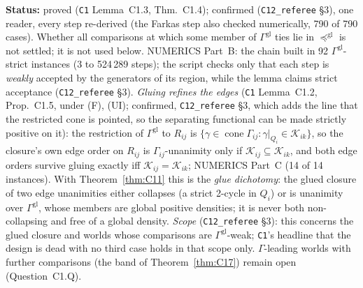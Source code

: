 \documentclass[11pt]{article}
\theoremstyle{definition}
\theoremstyle{remark}
\newcommand{\src}[1]{\texttt{#1}}
\newcommand{\status}[1]{\par\smallskip\noindent\textbf{Status:} #1\par\smallskip}
\begin{document}
\status{proved (\src{C1} Lemma~C1.3, Thm.~C1.4); confirmed (\src{C12\_referee} \S3), one reader, every step re-derived (the Farkas step also checked numerically, 790 of 790 cases). Whether all comparisons at which some member of $\Gamma^{\mathrm{gl}}$ ties lie in $\preceq^{\mathrm{gl}}$ is not settled; it is not used below. NUMERICS Part~B: the chain built in 92 $\Gamma^{\mathrm{gl}}$-strict instances (3 to 524\,289 steps); the script checks only that each step is \emph{weakly} accepted by the generators of its region, while the lemma claims strict acceptance (\src{C12\_referee} \S3). \emph{Gluing refines the edges} (\src{C1} Lemma~C1.2, Prop.~C1.5, under (F), (UI); confirmed, \src{C12\_referee} \S3, which adds the line that the restricted cone is pointed, so the separating functional can be made strictly positive on it): the restriction of $\Gamma^{\mathrm{gl}}$ to $R_{ij}$ is $\{\gamma\in\operatorname{cone}\Gamma_{ij}:\gamma|_{Q_i}\in\mathcal K_{ik}\}$, so the closure's own edge order on $R_{ij}$ is $\Gamma_{ij}$-unanimity only if $\mathcal K_{ij}\subseteq\mathcal K_{ik}$, and both edge orders survive gluing exactly iff $\mathcal K_{ij}=\mathcal K_{ik}$; NUMERICS Part~C (14 of 14 instances). With Theorem~\ref{thm:C11} this is the \emph{glue dichotomy}: the glued closure of two edge unanimities either collapses (a strict 2-cycle in $Q_i$) or is unanimity over $\Gamma^{\mathrm{gl}}$, whose members are global positive densities; it is never both non-collapsing and free of a global density. \emph{Scope} (\src{C12\_referee} \S3): this concerns the glued closure and worlds whose comparisons are $\Gamma^{\mathrm{gl}}$-weak; \src{C1}'s headline that the design is dead with no third case holds in that scope only. $\Gamma$-leading worlds with further comparisons (the band of Theorem~\ref{thm:C17}) remain open (Question~C1.Q).}
\end{document}
